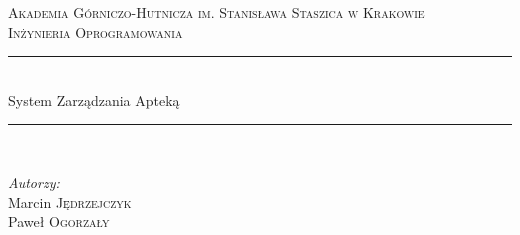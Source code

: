\documentclass[a4paper, 11pt]{article}
\begin{document}
	\begin{titlepage}
	
	
		
		\newcommand{\HRule}{\rule{\linewidth}{0.5mm}} %
		
		\center %
		
		
		\textsc{\LARGE Akademia Górniczo-Hutnicza im. Stanisława Staszica w Krakowie}\\[1.5cm] %
		\textsc{\Large Inżynieria Oprogramowania}\\[1.5cm]
		
		
		\HRule \\[0.4cm]
		{\fontsize{38}{50}\selectfont System Zarządzania Apteką}
		\HRule \\[5.5cm]
		
		

\begin{minipage}{0.4\textwidth}
\begin{flushleft} \large 
\emph{Autorzy:}\\
Marcin \textsc{Jędrzejczyk}\\ %
Paweł \textsc{Ogorzały} \\


\end{flushleft}
\end{minipage}
\end{titlepage}
\end{document}

